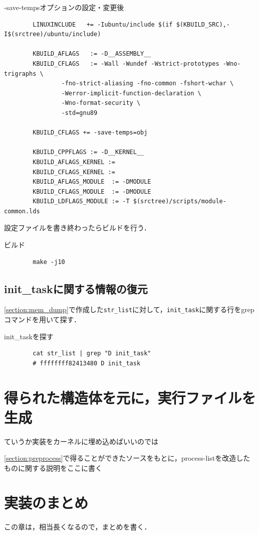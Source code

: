\begin{itembox}[l]{-save-tempsオプションの設定・変更後}
    \begin{verbatim}
        LINUXINCLUDE   += -Iubuntu/include $(if $(KBUILD_SRC),-I$(srctree)/ubuntu/include)

        KBUILD_AFLAGS   := -D__ASSEMBLY__
        KBUILD_CFLAGS   := -Wall -Wundef -Wstrict-prototypes -Wno-trigraphs \
                -fno-strict-aliasing -fno-common -fshort-wchar \
                -Werror-implicit-function-declaration \
                -Wno-format-security \
                -std=gnu89

        KBUILD_CFLAGS += -save-temps=obj

        KBUILD_CPPFLAGS := -D__KERNEL__
        KBUILD_AFLAGS_KERNEL :=
        KBUILD_CFLAGS_KERNEL :=
        KBUILD_AFLAGS_MODULE  := -DMODULE
        KBUILD_CFLAGS_MODULE  := -DMODULE
        KBUILD_LDFLAGS_MODULE := -T $(srctree)/scripts/module-common.lds
    \end{verbatim}
\end{itembox}

設定ファイルを書き終わったらビルドを行う．

\begin{itembox}[l]{ビルド}
    \begin{verbatim}
        make -j10
    \end{verbatim}
\end{itembox}

\subsection{init\_taskに関する情報の復元}

\ref{section:mem_dump}で作成した\verb|str_list|に対して，\verb|init_task|に関する行をgrepコマンドを用いて探す．

\begin{itembox}[l]{init_taskを探す}
    \begin{verbatim}
        cat str_list | grep "D init_task"
        # ffffffff82413480 D init_task
    \end{verbatim}
\end{itembox}

\section{得られた構造体を元に，実行ファイルを生成}

ていうか実装をカーネルに埋め込めばいいのでは

\ref{section:preprocess}で得ることができたソースをもとに，process-listを改造したものに関する説明をここに書く

\section{実装のまとめ}

この章は，相当長くなるので，まとめを書く．
